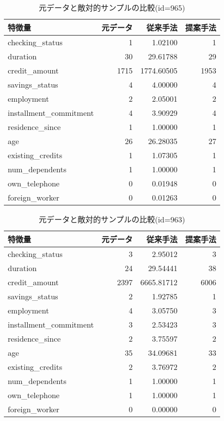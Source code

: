 \begin{table}[H]
    \centering
    \caption{元データと敵対的サンプルの比較(id=965)}
    \begin{tabular}{|l|r|r|r|} \hline
        特徴量 & 元データ & 従来手法 & 提案手法 \\ \hline
        checking\_status & 1 & 1.02100 & 1 \\ \hline
        duration & 30 & 29.61788 & 29 \\ \hline
        credit\_amount & 1715 & 1774.60505 & 1953 \\ \hline
        savings\_status & 4 & 4.00000 & 4 \\ \hline
        employment & 2 & 2.05001 & 2 \\ \hline
        installment\_commitment & 4 & 3.90929 & 4 \\ \hline
        residence\_since & 1 & 1.00000 & 1 \\ \hline
        age & 26 & 26.28035 & 27 \\ \hline
        existing\_credits & 1 & 1.07305 & 1 \\ \hline
        num\_dependents & 1 & 1.00000 & 1 \\ \hline
        own\_telephone & 0 & 0.01948 & 0 \\ \hline
        foreign\_worker & 0 & 0.01263 & 0 \\ \hline
    \end{tabular}
\end{table}

\begin{table}[H]
    \centering
    \caption{元データと敵対的サンプルの比較(id=963)}
    \begin{tabular}{|l|r|r|r|} \hline
        特徴量 & 元データ & 従来手法 & 提案手法 \\ \hline
        checking\_status & 3 & 2.95012 & 3 \\ \hline
        duration & 24 & 29.54441 & 38 \\ \hline
        credit\_amount & 2397 & 6665.81712 & 6006 \\ \hline
        savings\_status & 2 & 1.92785 & 1 \\ \hline
        employment & 4 & 3.05750 & 3 \\ \hline
        installment\_commitment & 3 & 2.53423 & 3 \\ \hline
        residence\_since & 2 & 3.75597 & 2 \\ \hline
        age & 35 & 34.09681 & 33 \\ \hline
        existing\_credits & 2 & 3.76972 & 2 \\ \hline
        num\_dependents & 1 & 1.00000 & 1 \\ \hline
        own\_telephone & 1 & 1.00000 & 1 \\ \hline
        foreign\_worker & 0 & 0.00000 & 0 \\ \hline
    \end{tabular}
\end{table}

